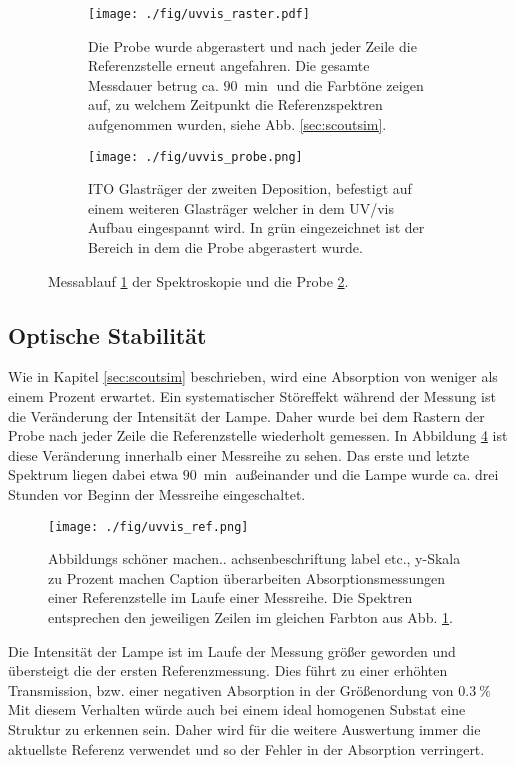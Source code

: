 \begin{figure}
    \begin{subfigure}[b]{0.65\textwidth}
      \texttt{[image: ./fig/uvvis\_raster.pdf]}
      \caption{Die Probe wurde abgerastert und nach jeder Zeile die Referenzstelle erneut angefahren. 
      Die gesamte Messdauer betrug ca. $\SI{90}{\min}$ und die Farbtöne zeigen auf, zu welchem Zeitpunkt die Referenzspektren aufgenommen wurden, siehe Abb. \ref{sec:scoutsim}.}
      \label{fig:uvvis_raster}
    \end{subfigure}\hfill
    \begin{subfigure}[b]{0.325\textwidth}
      \texttt{[image: ./fig/uvvis\_probe.png]}
      \caption{ITO Glasträger der zweiten Deposition, befestigt auf einem weiteren Glasträger welcher in dem UV/vis Aufbau eingespannt wird. In grün eingezeichnet ist der Bereich in dem die Probe abgerastert wurde.}
      \label{fig:uvvis_probe}
    \end{subfigure}
    \caption{Messablauf \ref{fig:uvvis_raster} der Spektroskopie und die Probe \ref{fig:uvvis_probe}.} 
    \label{fig:uvvis_ablauf}
\end{figure}

\subsection{Optische Stabilität}
Wie in Kapitel \ref{sec:scoutsim} beschrieben, wird eine Absorption von weniger als einem Prozent erwartet.
Ein systematischer Störeffekt während der Messung ist die Veränderung der Intensität der Lampe.
Daher wurde bei dem Rastern der Probe nach jeder Zeile die Referenzstelle wiederholt gemessen.
In Abbildung \ref{fig:uvvis_ref} ist diese Veränderung innerhalb einer Messreihe zu sehen.
Das erste und letzte Spektrum liegen dabei etwa $\SI{90}{\min}$ außeinander und die Lampe wurde ca. drei Stunden vor Beginn der Messreihe eingeschaltet.
\begin{figure}
    \centering
    \texttt{[image: ./fig/uvvis\_ref.png]}
    \caption{Abbildungs schöner machen.. achsenbeschriftung label etc., y-Skala zu Prozent machen Caption überarbeiten
    Absorptionsmessungen einer Referenzstelle im Laufe einer Messreihe.
    Die Spektren entsprechen den jeweiligen Zeilen im gleichen Farbton aus Abb. \ref{fig:uvvis_raster}.}
    \label{fig:uvvis_ref}
\end{figure}
Die Intensität der Lampe ist im Laufe der Messung größer geworden und übersteigt die der ersten Referenzmessung. 
Dies führt zu einer erhöhten Transmission, bzw. einer negativen Absorption in der Größenordung von $\SI{0.3}{\%}$
Mit diesem Verhalten würde auch bei einem ideal homogenen Substat eine Struktur zu erkennen sein.
Daher wird für die weitere Auswertung immer die aktuellste Referenz verwendet und so der Fehler in der Absorption verringert.
